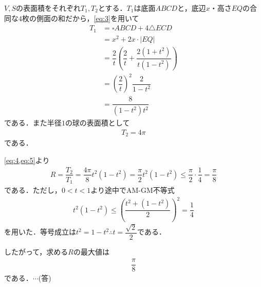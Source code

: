 \documentclass[../../main.tex]{subfiles}
\begin{document}
$V,S$の表面積をそれぞれ$T_1,T_2$とする．$T_1$は底面$ABCD$と，底辺$x$・高さ$EQ$の合同な$4$枚の側面の和だから，\cref{eq:3}を用いて
\begin{align}
  T_1&=\square ABCD+4\triangle ECD \\
  &=x^2+2x\cdot |EQ| \\
  &=\dfrac{2}{t}\left(\dfrac{2}{t}+\dfrac{2(1+t^2)}{t(1-t^2)}\right) \\
  &=\left(\dfrac{2}{t}\right)^2\dfrac{2}{1-t^2} \\
  &=\dfrac{8}{(1-t^2)t^2} \label{eq:4}
\end{align}
である．また半径$1$の球の表面積として
\begin{align}
  T_2=4\pi \label{eq:5}
\end{align}
である．

\cref{eq:4,eq:5}より
\begin{align}
  R=\dfrac{T_2}{T_1}=\dfrac{4\pi}{8}t^2(1-t^2)=\dfrac{\pi}{2}t^2(1-t^2) \le \dfrac{\pi}{2}\cdot\dfrac{1}{4} = \dfrac{\pi}{8} \label{eq:6}
\end{align}
である．ただし，$0<t<1$より途中でAM-GM不等式
\begin{align}
  t^2(1-t^2) \le \left(\dfrac{t^2+(1-t^2)}{2}\right)^2 = \dfrac{1}{4}
\end{align}
を用いた．等号成立は$t^2=1-t^2 \therefore t=\dfrac{\sqrt{2}}{2}$である．

したがって，求める$R$の最大値は
\begin{align}
  \dfrac{\pi}{8}
\end{align}
である．$\cdots$(答)
\end{document}
